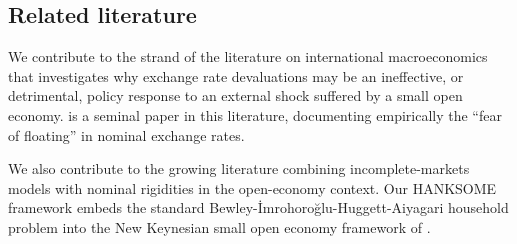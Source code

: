 \documentclass[\latexroot/\projectname]{subfiles}
\begin{document}
\subsection{Related literature}
\whenintegrated{\label{sec:literature}} %

We contribute to the strand of the literature on international macroeconomics that investigates why exchange rate devaluations may be an ineffective, or detrimental, policy response to an external shock suffered by a small open economy. \cite{CalvoReinhart2002} is a seminal paper in this literature, documenting empirically the ``fear of floating'' in nominal exchange rates.

We also contribute to the growing literature combining incomplete-markets models with nominal rigidities in the open-economy context. Our HANKSOME framework embeds the standard Bewley-\.{I}mrohoro\u{g}lu-Huggett-Aiyagari household problem into the New Keynesian small open economy framework of \cite{GaliMonacelli2005}.

\smartbib
\end{document}
